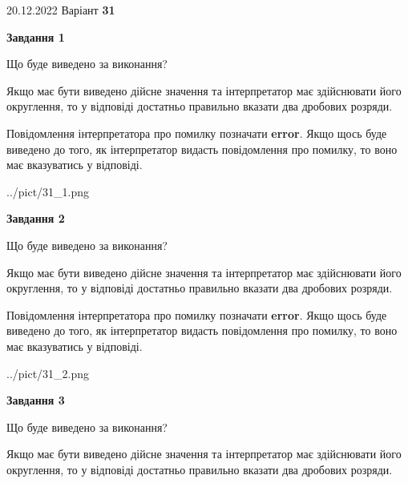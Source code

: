 \documentclass[12pt, ukrainian]{article}
\begin{document}
{20.12.2022 Варіант \No \textbf { 31 }\par}
{
\begin {Large}

{\begin {center}\textbf{Завдання 1}\end {center}}\par
Що буде виведено за виконання? \par

Якщо має бути виведено дійсне значення та інтерпретатор має здійснювати його округлення, 
то у відповіді достатньо правильно вказати два дробових розряди.

Повідомлення інтерпретатора про помилку позначати \textbf{error}.
Якщо щось буде виведено до того, як інтерпретатор видасть повідомлення про помилку, 
то воно має вказуватись у відповіді. \par

\begin{center}
	{../pict/31_1.png}
\end{center}
\newpage

{\begin {center}\textbf{Завдання 2}\end {center}}\par
Що буде виведено за виконання? \par

Якщо має бути виведено дійсне значення та інтерпретатор має здійснювати його округлення, 
то у відповіді достатньо правильно вказати два дробових розряди.

Повідомлення інтерпретатора про помилку позначати \textbf{error}.
Якщо щось буде виведено до того, як інтерпретатор видасть повідомлення про помилку, 
то воно має вказуватись у відповіді. \par

\begin{center}
	{../pict/31_2.png}
\end{center}
\newpage

{\begin {center}\textbf{Завдання 3}\end {center}}\par
Що буде виведено за виконання? \par

Якщо має бути виведено дійсне значення та інтерпретатор має здійснювати його округлення, 
то у відповіді достатньо правильно вказати два дробових розряди.


\end{Large}}
\end{document}
